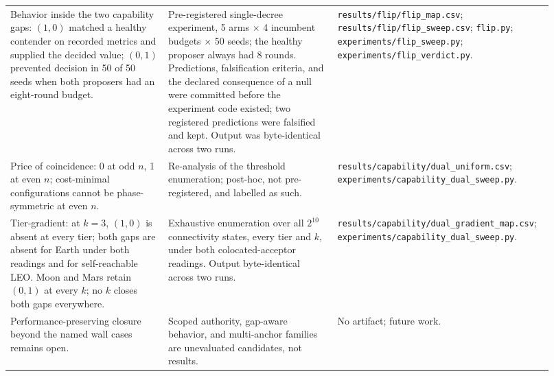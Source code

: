 \documentclass[letterpaper,twocolumn,10pt]{article}
\newcounter{prop}
\newcounter{cor}
\begin{document}
\begin{table}[t]
\begin{tabular}{p{0.28\linewidth}p{0.30\linewidth}p{0.34\linewidth}}
Behavior inside the two capability gaps: $(1,0)$ matched a healthy contender on recorded metrics and supplied the decided value; $(0,1)$ prevented decision in 50 of 50 seeds when both proposers had an eight-round budget. & Pre-registered single-decree experiment, 5 arms $\times$ 4 incumbent budgets $\times$ 50 seeds; the healthy proposer always had 8 rounds. Predictions, falsification criteria, and the declared consequence of a null were committed before the experiment code existed; two registered predictions were falsified and kept. Output was byte-identical across two runs. & \texttt{results/flip/\allowbreak flip\_map.csv}; \texttt{results/flip/\allowbreak flip\_sweep.csv}; \texttt{flip.py}; \texttt{experiments/\allowbreak flip\_sweep.py}; \texttt{experiments/\allowbreak flip\_verdict.py}. \\
Price of coincidence: 0 at odd $n$, 1 at even $n$; cost-minimal configurations cannot be phase-symmetric at even $n$. & Re-analysis of the threshold enumeration; post-hoc, not pre-registered, and labelled as such. & \texttt{results/capability/\allowbreak dual\_uniform.csv}; \texttt{experiments/\allowbreak capability\_dual\_sweep.py}. \\
Tier-gradient: at $k=3$, $(1,0)$ is absent at every tier; both gaps are absent for Earth under both readings and for self-reachable LEO. Moon and Mars retain $(0,1)$ at every $k$; no $k$ closes both gaps everywhere. & Exhaustive enumeration over all $2^{10}$ connectivity states, every tier and $k$, under both colocated-acceptor readings. Output byte-identical across two runs. & \texttt{results/capability/\allowbreak dual\_gradient\_map.csv}; \texttt{experiments/\allowbreak capability\_dual\_sweep.py}. \\
Performance-preserving closure beyond the named wall cases remains open. & Scoped authority, gap-aware behavior, and multi-anchor families are unevaluated candidates, not results. & No artifact; future work. \\
\bottomrule
\end{tabular}
\end{table}
\end{document}
